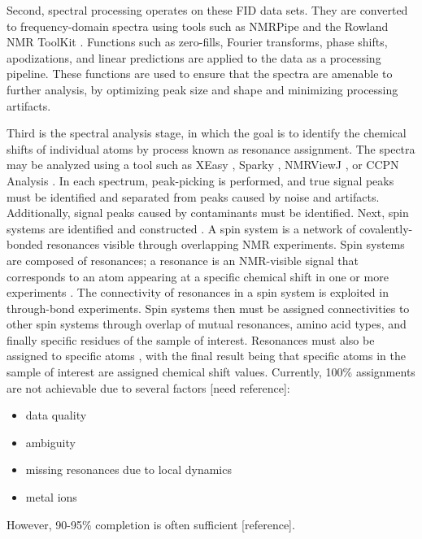 \documentclass[a4paper]{report}
\begin{document}
Second, spectral processing operates on these FID data sets.  They are 
converted to frequency-domain spectra using tools such as NMRPipe \cite{nmrpipe}
and the Rowland NMR ToolKit \cite{rnmrtk}.  Functions such as 
zero-fills, Fourier transforms, phase shifts, apodizations, and linear 
predictions are applied to the data as a processing pipeline.  These 
functions are used to ensure that the spectra are amenable to further 
analysis, by optimizing peak size and shape and minimizing processing 
artifacts.

Third is the spectral analysis stage, in which the goal is to identify the 
chemical shifts of individual atoms by process known as resonance assignment.
The spectra may be analyzed using a tool such as XEasy \cite{xeasy}, 
Sparky \cite{sparky}, NMRViewJ \cite{nmrviewj}, or CCPN Analysis \cite{ccpn}.  
In each spectrum, peak-picking is performed, and true signal peaks must 
be identified and separated from peaks caused by noise and artifacts.  
Additionally, signal peaks caused by contaminants must be identified.  
Next, spin systems are identified and constructed \cite{ccpn}. 
A spin system is a network of covalently-bonded resonances visible through 
overlapping NMR experiments.  Spin systems are composed of resonances; a 
resonance is an NMR-visible signal that corresponds to an atom appearing 
at a specific chemical shift in one or more experiments \cite{ccpn}.  
The connectivity of resonances in a spin system is exploited 
in through-bond experiments.  Spin systems then must be assigned 
connectivities to other spin systems through overlap of mutual resonances, 
amino acid types, and finally specific residues of the sample of interest. 
Resonances must also be assigned to specific atoms \cite{ccpn}, 
with the final result being that specific atoms in the sample of interest 
are assigned chemical shift values.  Currently, 100\% assignments are not 
achievable due to several factors [need reference]: 
\begin{itemize}
  \item data quality
  \item ambiguity
  \item missing resonances due to local dynamics
  \item metal ions
\end{itemize}
However, 90-95\% completion is often sufficient [reference].
\end{document}
